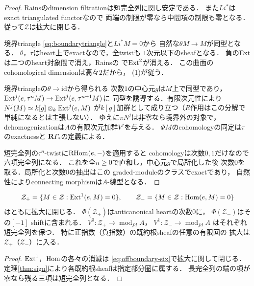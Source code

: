 \begin{proof}
Rainsのdimension filtrationは短完全列に関し安定である．
また$Li^*$はexact triangulated functorなので
両端の制限が零なら中間項の制限も零となる．
従って$\mathcal Z$は拡大に閉じる．

境界triangle \eqref{eq:boundarytriangle}と$Li^*M=0$から
自然な$\theta M\to M$が同型となる．
$\theta$，$\tau$はheart上でexactなので，全twistも
$1$次元以下のsheafとなる．
負のExtは二つのheart対象間で消え，Rainsの
\cite[Corollary 7.23]{RainsBirational}で$\operatorname{Ext}^2$が消える．
この曲面のcohomological dimensionは高々$2$だから，
(1)が従う．

境界triangleの$\theta\to\mathrm{id}$から得られる
次数$1$の中心元$g$は$M$上で同型であり，
$\operatorname{Ext}^j(e,\tau^nM)\to\operatorname{Ext}^j(e,\tau^{n+1}M)$に
同型を誘導する．有限次元性により
$N^j(M)\simeq k[g]\otimes_k\operatorname{Ext}^j(e,M)$
が$k[g]$加群として成り立つ（$R$作用はこの分解で
単純になるとは主張しない）．
ゆえに$\pi N^j$は非零なら境界外の対象で，
dehomogenizationは$A$の有限次元加群$V^j$を与える．
$\Phi M$のcohomologyの同定は$\pi$のexactnessと
$\mathbf R\Gamma_*$の定義による．

短完全列の$\tau^n$-twistに$\operatorname{RHom}(e,-)$を適用すると
cohomologyは次数$0,1$だけなので六項完全列になる．
これを全$n\ge0$で直和し，中心元$g$で局所化した後
次数$0$を取る．局所化と次数$0$の抽出はこの
graded-moduleのクラスでexactであり，
自然性によりconnecting morphismは$A$-線型となる．
\end{proof}

\begin{corollary}
\label{cor:offboundary-sign-exact}
\[
 \mathcal Z_+=\{M\in\mathcal Z:\operatorname{Ext}^1(e,M)=0\},\qquad
 \mathcal Z_-=\{M\in\mathcal Z:\operatorname{Hom}(e,M)=0\}
\]
はともに拡大に閉じる．
$\Phi(\mathcal Z_+)$はanticanonical heartの次数$0$に，
$\Phi(\mathcal Z_-)$はその$[-1]$ shiftに含まれる．
$V^0:\mathcal Z_+\to\operatorname{mod}_{fd}A$，
$V^1:\mathcal Z_-\to\operatorname{mod}_{fd}A$
はそれぞれ短完全列を保つ．
特に正指数（負指数）の既約根sheafの任意の有限回の
拡大は$\mathcal Z_+$（$\mathcal Z_-$）に入る．
\end{corollary}
\begin{proof}
$\operatorname{Ext}^1$，$\operatorname{Hom}$の各々の消滅は
\eqref{eq:offboundary-six}で拡大に関して閉じる．
定理\ref{thm:sign}により各既約根sheafは指定部分圏に属する．
長完全列の端の項が零なら残る三項は短完全列となる．
\end{proof}

